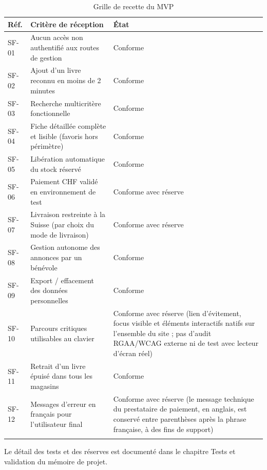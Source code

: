 \documentclass[10pt, a4paper]{article}
\begin{document}
\begin{longtable}{@{}L{1.3cm}L{8.5cm}L{3.9cm}@{}}
\toprule
\textbf{Réf.} & \textbf{Critère de réception} & \textbf{État} \\
\midrule
\endhead
SF-01 & Aucun accès non authentifié aux routes de gestion & Conforme \\
SF-02 & Ajout d'un livre reconnu en moins de 2 minutes & Conforme \\
SF-03 & Recherche multicritère fonctionnelle & Conforme \\
SF-04 & Fiche détaillée complète et lisible (favoris hors périmètre) & Conforme \\
SF-05 & Libération automatique du stock réservé & Conforme \\
SF-06 & Paiement CHF validé en environnement de test & Conforme avec réserve \\
SF-07 & Livraison restreinte à la Suisse (par choix du mode de livraison) & Conforme avec réserve \\
SF-08 & Gestion autonome des annonces par un bénévole & Conforme \\
SF-09 & Export / effacement des données personnelles & Conforme \\
SF-10 & Parcours critiques utilisables au clavier & Conforme avec réserve (lien d'évitement, focus visible et éléments interactifs natifs sur l'ensemble du site ; pas d'audit RGAA/WCAG externe ni de test avec lecteur d'écran réel) \\
SF-11 & Retrait d'un livre épuisé dans tous les magasins & Conforme \\
SF-12 & Messages d'erreur en français pour l'utilisateur final & Conforme avec réserve (le message technique du prestataire de paiement, en anglais, est conservé entre parenthèses après la phrase française, à des fins de support) \\
\bottomrule
\caption{Grille de recette du MVP}
\end{longtable}

\noindent Le détail des tests et des réserves est documenté dans le chapitre \og Tests et
validation \fg{} du mémoire de projet.
\end{document}
